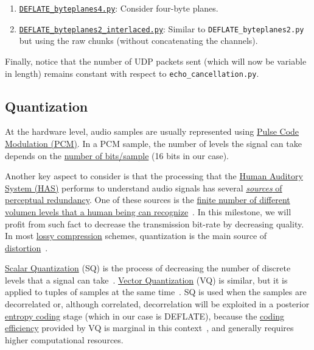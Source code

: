 \begin{enumerate}
  byte-planes. This would allow compression of
  \emph{coefficients}\footnote{Used in a future improvements of
  intercom.} that requires more than two bytes to be represented.
\item
  \href{https://github.com/Tecnologias-multimedia/InterCom/blob/master/src/DEFLATE\_byteplanes4.py}{\texttt{DEFLATE\_byteplanes4.py}}:
  Consider four-byte planes.
\item
  \href{https://github.com/Tecnologias-multimedia/InterCom/blob/master/src/DEFLATE_byteplanes2\_interlaced.py}{\texttt{DEFLATE\_byteplanes2\_interlaced.py}}:
  Similar to \verb|DEFLATE_byteplanes2.py| but using the raw chunks
  (without concatenating the channels).
\end{enumerate}

Finally, notice that the number of UDP packets sent (which will now be
variable in length) remains constant with respect to
\verb|echo_cancellation.py|.

\subsection{Quantization}
At the hardware level, audio samples are usually represented
using \href{https://en.wikipedia.org/wiki/Pulse-code_modulation}{Pulse
  Code Modulation (PCM)}. In a PCM sample, the number of levels
the signal can take depends on the
\href{https://en.wikipedia.org/wiki/Audio_bit_depth}{number of
  bits/sample} (16 bits in our case).

Another key aspect to consider is that the processing that the
\href{https://en.wikipedia.org/wiki/Auditory_system}{Human
  Auditory System (HAS)} performs to understand audio signals has several
\href{https://en.wikipedia.org/wiki/Psychoacoustics}{\emph{sources} of
  perceptual redundancy}. One of these sources is the
\href{https://en.wikipedia.org/wiki/Equal-loudness_contour}{finite
  number of different volumen levels that a human being can
  recognize}~\cite{bosi2003intro}. In this milestone, we will profit from
such fact to decrease the transmission bit-rate by decreasing
quality. In most
\href{https://en.wikipedia.org/wiki/Lossy_compression}{lossy
  compression} schemes, quantization is the main source of
\href{https://en.wikipedia.org/wiki/Distortion}{distortion}~\cite{taubman2002jpeg2000}.

\href{https://en.wikipedia.org/wiki/Quantization_(signal_processing)}{Scalar
  Quantization} (SQ) is the process of decreasing the number of
discrete levels that a signal can
take~\cite{sayood2017introduction}. \href{https://en.wikipedia.org/wiki/Vector_quantization}{Vector
  Quantization} (VQ) is similar, but it is applied to tuples of samples
at the same time~\cite{vetterli2014foundations}. SQ is used when
the samples are decorrelated or, although correlated,
decorrelation will be exploited in a posterior
\href{https://en.wikipedia.org/wiki/Entropy_encoding}{entropy coding}
stage (which in our case is DEFLATE), because the
\href{https://en.wikipedia.org/wiki/Quantization_(signal_processing)#Rate%E2%80%93distortion_optimization}{coding
  efficiency} provided by VQ is marginal in this
context~\cite{vetterli2014foundations}, and generally requires higher
computational resources.

